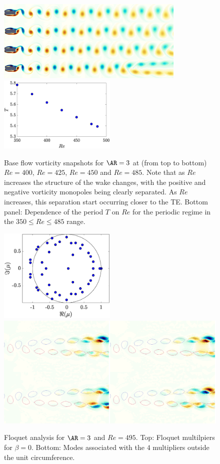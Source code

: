 \begin{figure}
  \centering
  \includegraphics[width=0.8\textwidth]{./fig/AR3/BF_vort_Re400_475.png}
  \includegraphics[width=0.5\textwidth]{./fig/AR3/T_Re.eps}
  \caption{Base flow vorticity snapshots for $\AR=3$ at (from top to bottom) $Re=400$, $Re=425$, $Re=450$ and $Re=485$. Note that as $Re$ increases the structure of the wake changes, with the positive and negative vorticity monopoles being clearly separated. As $Re$ increases, this separation start occurring closer to the TE. Bottom panel: Dependence of the period $T$ on $Re$ for the periodic regime in the $350 \le Re \le 485$ range.}
  \label{fig:BF_AR3}
\end{figure}

\begin{figure}
  \centering
  \includegraphics[width=0.5\textwidth]{./fig/AR3/mult_Re495_beta0.eps}
  \includegraphics[width=1.0\textwidth]{./fig/AR3/Floquet_modes_beta_0_Re495.png}
  \caption{Floquet analysis for $\AR=3$ and $Re=495$. Top: Floquet multilpiers for $\beta = 0$. Bottom: Modes associated with the $4$ multipliers outside the unit circumference.}
  \label{fig:AR3_Stab}
\end{figure}


